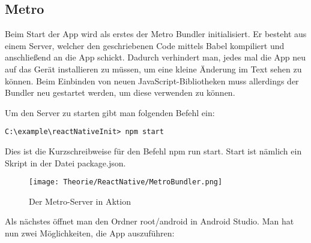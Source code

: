 \newpage
\subsection{Metro}
\label{metrobundler}
Beim Start der App wird als erstes der Metro Bundler initialisiert. Er besteht aus einem Server,
welcher den geschriebenen Code mittels Babel kompiliert und anschließend an die App schickt. Dadurch
verhindert man, jedes mal die App neu auf das Gerät installieren zu müssen, um eine kleine Änderung
im Text sehen zu können. Beim Einbinden von neuen JavaScript-Bibliotheken muss allerdings der
Bundler neu gestartet werden, um diese verwenden zu können.

Um den Server zu starten gibt man folgenden Befehl ein:

\begin{lstlisting}
C:\example\reactNativeInit> npm start
\end{lstlisting}

Dies ist die Kurzschreibweise für den Befehl npm run start. Start ist nämlich ein Skript in der
Datei package.json.

\begin{figure}[H]
  \begin{center}
    \texttt{[image: Theorie/ReactNative/MetroBundler.png]}
    \caption{Der Metro-Server in Aktion}
  \end{center}
\end{figure}

\newpage
Als nächstes öffnet man den Ordner root/android in Android Studio. Man hat nun zwei Möglichkeiten,
die App auszuführen:

